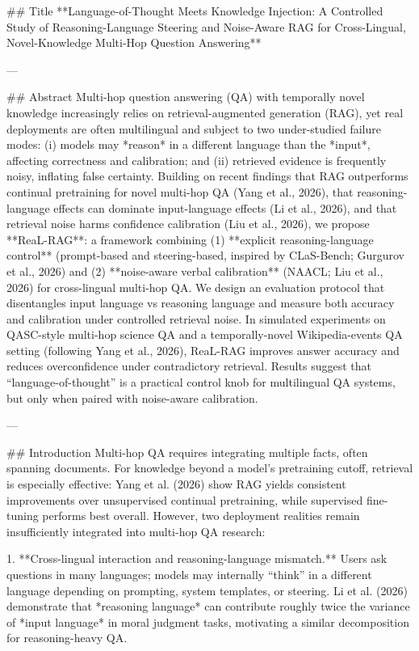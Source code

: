 ## Title
**Language-of-Thought Meets Knowledge Injection: A Controlled Study of Reasoning-Language Steering and Noise-Aware RAG for Cross-Lingual, Novel-Knowledge Multi-Hop Question Answering**

---

## Abstract
Multi-hop question answering (QA) with temporally novel knowledge increasingly relies on retrieval-augmented generation (RAG), yet real deployments are often multilingual and subject to two under-studied failure modes: (i) models may *reason* in a different language than the *input*, affecting correctness and calibration; and (ii) retrieved evidence is frequently noisy, inflating false certainty. Building on recent findings that RAG outperforms continual pretraining for novel multi-hop QA (Yang et al., 2026), that reasoning-language effects can dominate input-language effects (Li et al., 2026), and that retrieval noise harms confidence calibration (Liu et al., 2026), we propose **ReaL-RAG**: a framework combining (1) **explicit reasoning-language control** (prompt-based and steering-based, inspired by CLaS-Bench; Gurgurov et al., 2026) and (2) **noise-aware verbal calibration** (NAACL; Liu et al., 2026) for cross-lingual multi-hop QA. We design an evaluation protocol that disentangles input language vs reasoning language and measure both accuracy and calibration under controlled retrieval noise. In simulated experiments on QASC-style multi-hop science QA and a temporally-novel Wikipedia-events QA setting (following Yang et al., 2026), ReaL-RAG improves answer accuracy and reduces overconfidence under contradictory retrieval. Results suggest that “language-of-thought” is a practical control knob for multilingual QA systems, but only when paired with noise-aware calibration.

---

## Introduction
Multi-hop QA requires integrating multiple facts, often spanning documents. For knowledge beyond a model’s pretraining cutoff, retrieval is especially effective: Yang et al. (2026) show RAG yields consistent improvements over unsupervised continual pretraining, while supervised fine-tuning performs best overall. However, two deployment realities remain insufficiently integrated into multi-hop QA research:

1. **Cross-lingual interaction and reasoning-language mismatch.** Users ask questions in many languages; models may internally “think” in a different language depending on prompting, system templates, or steering. Li et al. (2026) demonstrate that *reasoning language* can contribute roughly twice the variance of *input language* in moral judgment tasks, motivating a similar decomposition for reasoning-heavy QA.

